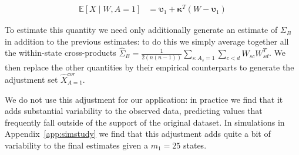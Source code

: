 \begin{align}\label{eqn:xcoradjust}
    \mathbb{E}[X \mid W, A = 1] &=  \boldsymbol{\upsilon}_1 + \boldsymbol{\kappa}^T(W - \boldsymbol{\upsilon}_1)  
\end{align}

To estimate this quantity we need only additionally generate an estimate of $\Sigma_B$ in addition to the previous estimates: to do this we simply average together all the within-state cross-products $\hat{\Sigma}_{B} = \frac{1}{2(n(n - 1))}\sum_{s: A_s = 1}\sum_{c < d}W_{sc}W_{sd}^T$. We then replace the other quantities by their empirical counterparts to generate the adjustment set $\hat{X}_{A=1}^{cor}$.

We do not use this adjustment for our application: in practice we find that it adds substantial variability to the observed data, predicting values that frequently fall outside of the support of the original dataset. In simulations in Appendix~\ref{app:simstudy} we find that this adjustment adds quite a bit of variability to the final estimates given a $m_1 = 25$ states. 